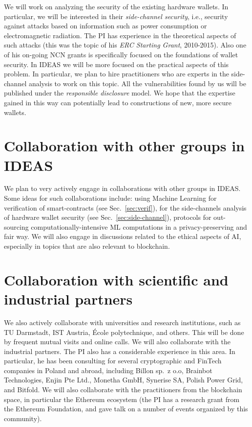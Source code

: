 \documentclass{article}
\begin{document}
We will work on analyzing the security of the existing hardware wallets. In particular, we will be interested in their \emph{side-channel security}, i.e., security against attacks based on information such as power consumption or electromagnetic radiation. The PI has experience in the theoretical aspects of such attacks (this was the topic of his \emph{ERC Starting Grant}, 2010-2015). Also one of his on-going NCN grants is specifically focused on the foundations of wallet security. In IDEAS we will be more focused on the practical aspects of this problem. In particular, we plan to hire practitioners who are experts in the side-channel analysis to work on this topic. All the vulnerabilities found by us will be published under the \emph{responsible disclosure} model. We hope that the expertise gained in this way can potentially lead to constructions of new, more secure wallets. 

\section{Collaboration with other groups in IDEAS}

We plan to very actively engage in collaborations with other groups in IDEAS. Some ideas for such collaborations include: using Machine Learning for verification of smart-contracts (see Sec.~\ref{sec:verif}), for the side-channels analysis of hardware wallet security (see Sec.~\ref{sec:side-channel}), protocols for out-sourcing computationally-intensive ML computations in a privacy-preserving and fair way. We will also engage in discussions related to the ethical aspects of AI, especially in topics that are also relevant to blockchain.



\section{Collaboration with scientific and industrial partners}

We also actively collaborate with universities and research institutions, such as TU Darmstadt, IST Austria, \'Ecole polytechnique, and others. This will be done by frequent mutual visits and online calls. We will also collaborate with the industrial partners. The PI also has a considerable experience in this area. In particular, he has been consulting for several cryptographic and FinTech companies in Poland and abroad, including  Billon sp.~z o.o, Brainbot Technologies, Enjin Pte Ltd., Monetha GmbH, Synerise SA, Polish Power Grid, and  Bitfold. We will also collaborate with the practitioners from the blockchain space, in particular the Ethereum ecosystem (the PI has a research grant from the Ethereum Foundation, and gave talk on a number of events organized by this community). 
\end{document}
